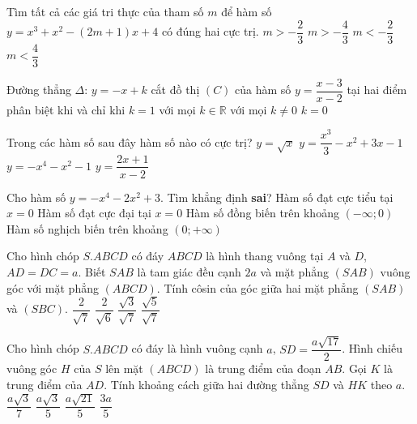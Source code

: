 \begin{ex}%
Tìm tất cả các giá tri thực của tham số $m$ để hàm số $y=x^3+x^2-(2m+1)x+4$ có đúng hai cực trị.
	\choice
	{\True $m>-\dfrac{2}{3}$}
	{$m>-\dfrac{4}{3}$}
	{$m<-\dfrac{2}{3}$}
	{$m<\dfrac{4}{3}$}
\end{ex}
\begin{ex}%
Đường thẳng $\Delta$: $y=-x+k$ cắt đồ thị $(C)$ của hàm số $y=\dfrac{x-3}{x-2}$ tại hai điểm phân biệt khi và chỉ khi
	\choice
	{$k=1$}
	{\True với mọi $k\in\mathbb{R}$}
	{với mọi $k\ne 0$}
	{$k=0$}
\end{ex}
\begin{ex}%
Trong các hàm số sau đây hàm số nào có cực trị?
	\choice
	{$y=\sqrt{x}$}
	{$y=\dfrac{x^3}{3}-x^2+3x-1$}
	{\True $y=-x^4-x^2-1$}
	{$y=\dfrac{2x+1}{x-2}$}
\end{ex}
\begin{ex}%
Cho hàm số $y=-x^4-2x^2+3$. Tìm khẳng định \textbf{sai}?
	\choice
	{\True Hàm số đạt cực tiểu tại $x=0$}
	{Hàm số đạt cực đại tại $x=0$}
	{Hàm số đồng biến trên khoảng $(-\infty;0)$}
	{Hàm số nghịch biến trên khoảng $(0;+\infty)$}
\end{ex}
\begin{ex}%
Cho hình chóp $S.ABCD$ có đáy $ABCD$ là hình thang vuông tại $A$ và $D$, $AD=DC=a$. Biết $SAB$ là tam giác đều cạnh $2a$ và mặt phẳng $(SAB)$ vuông góc với mặt phẳng $(ABCD)$. Tính côsin của góc giữa hai mặt phẳng $(SAB)$ và $(SBC)$.
	\choice
	{$\dfrac{2}{\sqrt{7}}$}
	{$\dfrac{2}{\sqrt{6}}$}
	{$\dfrac{\sqrt{3}}{\sqrt{7}}$}
	{$\dfrac{\sqrt{5}}{\sqrt{7}}$}
\end{ex}
\begin{ex}%
Cho hình chóp $S.ABCD$ có đáy là hình vuông cạnh $a$, $SD=\dfrac{a\sqrt{17}}{2}$. Hình chiếu vuông góc $H$ của $S$ lên mặt $(ABCD)$ là trung điểm của đoạn $AB$. Gọi $K$ là trung điểm của $AD$. Tính khoảng cách giữa hai đường thẳng $SD$ và $HK$ theo $a$.
	\choice
	{$\dfrac{a\sqrt{3}}{7}$}
	{\True $\dfrac{a\sqrt{3}}{5}$}
	{$\dfrac{a\sqrt{21}}{5}$}
	{$\dfrac{3a}{5}$}
\end{ex}
